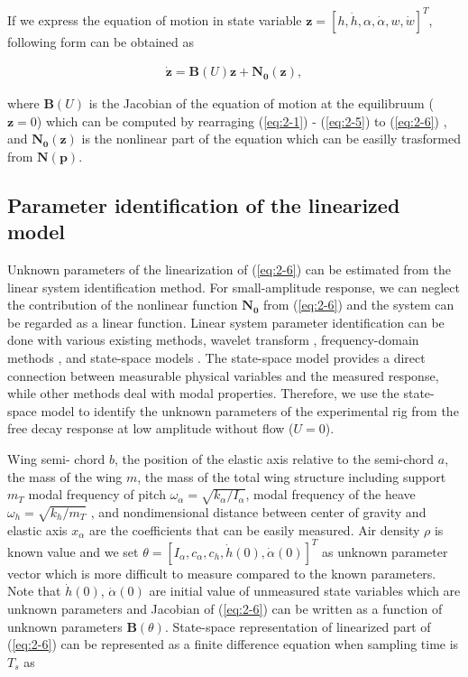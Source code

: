 \documentclass[openacc]{rsproca_new}%
\theoremstyle{own}
\def\vec#1{\ensuremath{\mathbf{#1}}}
\newcommand{\Eref}[1]{(\ref{#1})}
\begin{document}
\noindent If we express the equation of motion in state variable $ \vec{z} = [h, \dot h, \alpha, \dot \alpha, w, \dot {w}] ^T $, following form can be obtained as

\begin{align}\label{eq:2-6}
\dot{\vec{z}}= \vec{B}(U)\vec{z}+\vec{N_0}(\vec{z}),
\end{align}

\noindent where $\vec{B}(U)$ is the Jacobian of the equation of motion at the equilibruum ($\vec z=0$) which can be computed by rearraging \Eref{eq:2-1} - \Eref{eq:2-5} to \Eref{eq:2-6}
, and $\vec{N_0}(\vec{z})$ is the nonlinear part of the equation which can be easilly trasformed from $\vec{N}(\vec{p})$.

\subsection{Parameter identification of the linearized model}\label{linear}

Unknown parameters of the linearization of \Eref{eq:2-6} can be estimated from the linear system identification method. For small-amplitude response, we can neglect the contribution of the nonlinear function $\vec{N_0}$ from \Eref{eq:2-6} and the system can be regarded as a linear function. Linear system parameter identification can be done with various existing methods, wavelet transform \cite{ruzzene1997natural}, frequency-domain methods \cite{pintelon2012system}, and state-space models \cite{ljung2001system}. The state-space model provides a direct connection between measurable physical variables and the measured response, while other methods deal with modal properties. Therefore, we use the state-space model to identify the unknown parameters of the experimental rig from the free decay response at low amplitude without flow ($U=0$).

Wing semi- chord $b$, the position of the elastic axis relative to the semi-chord $a$, the mass of the wing $m$, the mass of the total wing structure including support $m_T$
modal frequency of pitch $\omega_\alpha=\sqrt{k_\alpha / I_\alpha}$, modal frequency of the heave $\omega_h=\sqrt{k_h/m_T}$ , and nondimensional distance between center of gravity and elastic axis $x_\alpha$ are the coefficients that can be easily measured.
Air density $\rho$ is known value and we set $\theta=[I_\alpha,c_\alpha,c_h,\dot h(0),\dot \alpha(0)]^T$ as unknown parameter vector which is more difficult to measure compared to the known parameters. Note that $\dot h(0)$, $\dot \alpha(0)$ are initial value of unmeasured state variables which are unknown parameters and Jacobian of \Eref{eq:2-6} can be written as a function of unknown parameters $\vec{B}(\theta)$. State-space representation of linearized part of \Eref{eq:2-6} can be represented as a finite difference equation when sampling time is $T_s$ as
\end{document}
